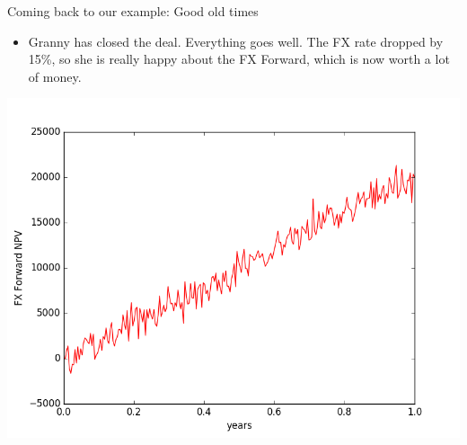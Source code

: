 \documentclass[t]{beamer}
\begin{document}
\begin{frame}{Coming back to our example: Good old times}
	\begin{itemize}
		\item
			Granny has closed the deal. Everything goes well. The FX rate dropped by 15\%, so she is really happy about the FX Forward, which is now worth a lot of money.
	\end{itemize}
	\begin{center}
		\includegraphics[scale=0.4]{pics/fx_foward_rising.png}
	\end{center}		
\end{frame}
\end{document}
